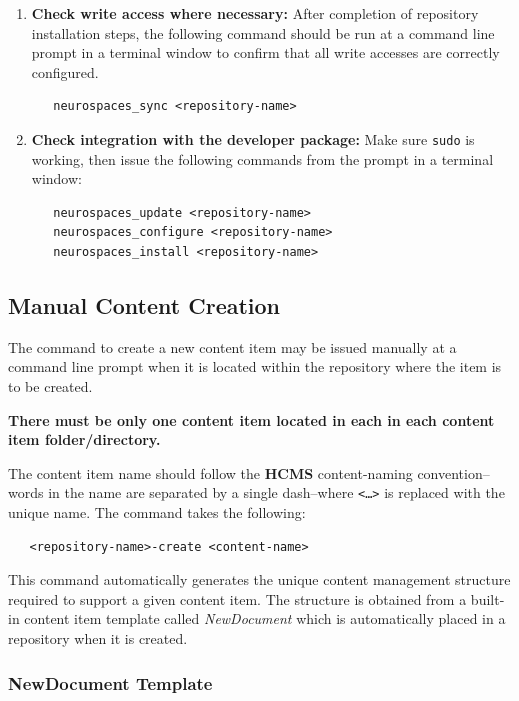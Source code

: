 \documentclass[12pt]{article}
\begin{document}
\begin{enumerate}
\item {\bf Check write access where necessary:} After completion of repository installation steps, the following command should  be run at a command line prompt  in a terminal window to confirm that all write accesses are correctly configured.

\begin{verbatim}
   neurospaces_sync <repository-name>
\end{verbatim}

\item {\bf Check integration with the developer package:} Make sure {\tt \small sudo} is working, then issue the following commands from the prompt in a terminal window:

\begin{verbatim}
   neurospaces_update <repository-name>
   neurospaces_configure <repository-name>
   neurospaces_install <repository-name>
\end{verbatim}
\end{enumerate}

\subsection*{Manual Content Creation}

The command to create a new content item may be issued manually at a command line prompt when it is located within the repository where the item is to be created.

{\bf There must be only one content item located in each in each content item folder/directory.}

The content item name should follow the {\bf \small HCMS} content-naming convention--words in the name are separated by a single dash--where {\tt <\dots>} is replaced with the unique name. The command takes the following:
\begin{verbatim}
   <repository-name>-create <content-name>
\end{verbatim}

This command automatically generates the unique content management structure required to support a given content item. The structure is obtained from a built-in content item template called {\it NewDocument} which is automatically placed in a repository when it is created.

\subsubsection*{NewDocument Template}
\end{document}
